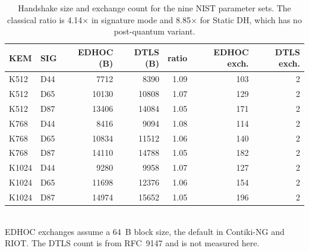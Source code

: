 \begin{table}[t]
\centering
\caption{Handshake size and exchange count for the nine NIST parameter sets. The classical ratio is 4.14$\times$ in signature mode and 8.85$\times$ for Static DH, which has no post-quantum variant.}
\label{tab:params}
\footnotesize
\begin{tabular}{llrrrrr}
\hline
KEM & SIG & EDHOC (B) & DTLS (B) & ratio & EDHOC exch. & DTLS exch. \\
\hline
K512 & D44 & 7712 & 8390 & 1.09 & 103 & 2 \\
K512 & D65 & 10130 & 10808 & 1.07 & 129 & 2 \\
K512 & D87 & 13406 & 14084 & 1.05 & 171 & 2 \\
K768 & D44 & 8416 & 9094 & 1.08 & 114 & 2 \\
K768 & D65 & 10834 & 11512 & 1.06 & 140 & 2 \\
K768 & D87 & 14110 & 14788 & 1.05 & 182 & 2 \\
K1024 & D44 & 9280 & 9958 & 1.07 & 127 & 2 \\
K1024 & D65 & 11698 & 12376 & 1.06 & 154 & 2 \\
K1024 & D87 & 14974 & 15652 & 1.05 & 196 & 2 \\
\hline
\end{tabular}
\\[2pt]{\footnotesize EDHOC exchanges assume a 64~B block size, the default in Contiki-NG and RIOT. The DTLS count is from RFC~9147 and is not measured here.}
\end{table}
